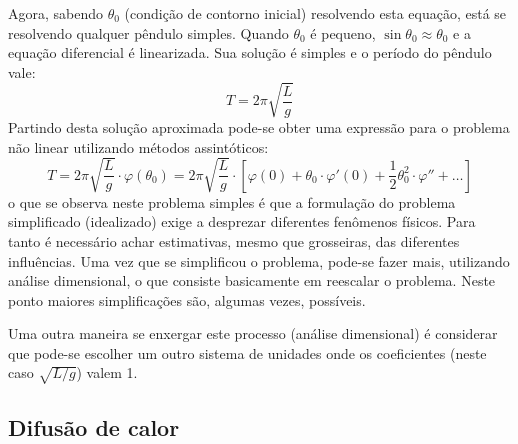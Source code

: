 Agora, sabendo $\theta_0$ (condição de contorno inicial) resolvendo esta equação, está se resolvendo qualquer pêndulo simples. Quando $\theta_0$ é pequeno, $\sin\theta_0\approx\theta_0$ e a equação diferencial é linearizada. Sua solução é simples e o período do pêndulo vale:
\[
T = 2\pi\sqrt{\frac{L}{g}}
\]
Partindo desta solução aproximada pode-se obter uma expressão para o problema não linear utilizando métodos assintóticos:
\[
T = 2\pi\sqrt{\frac{L}{g}}\cdot\varphi(\theta_0) = 2\pi \sqrt{\frac{L}{g}} \cdot\left[\varphi(0) + \theta_0\cdot\varphi'(0) +
\frac{1}{2}\theta_0^2\cdot\varphi'' + \ldots\right]
\]
o que se observa neste problema simples é que a formulação do problema simplificado (idealizado) exige a desprezar diferentes fenômenos físicos. Para tanto é necessário achar estimativas, mesmo que grosseiras, das diferentes influências. Uma vez que se simplificou o problema, pode-se fazer mais, utilizando análise dimensional, o que consiste basicamente em reescalar o problema. Neste ponto maiores simplificações são, algumas vezes, possíveis.

Uma outra maneira se enxergar este processo (análise dimensional) é considerar que pode-se escolher um outro sistema de unidades onde os coeficientes (neste caso $\sqrt{L/g}$) valem 1.

\subsection{Difusão de calor}
